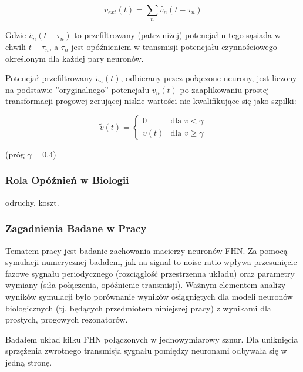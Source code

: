   \begin{equation}
    v_{ext}(t) = \displaystyle\sum\limits_{n} \widetilde{v_{n}}(t-\tau_{n})
  \end{equation}

  Gdzie $\widetilde{v_{n}}(t-\tau_{n})$ to przefiltrowany (patrz niżej) potencjał n-tego sąsiada w chwili $t-\tau_{n}$, a $\tau_{n}$ jest opóźnieniem w transmisji potencjału czynnościowego określonym dla każdej pary neuronów.

  Potencjał przefiltrowany $\widetilde{v_{n}}(t)$, odbierany przez połączone neurony, jest liczony na podstawie ''oryginalnego'' potencjału $v_{n}(t)$ po zaaplikowaniu prostej transformacji progowej zerującej niskie wartości nie kwalifikujące się jako szpilki:

  \begin{equation}
    \tilde{v}(t) = 
    \begin{cases}
      0 & \text{dla } v < \gamma \\
      v(t) & \text{dla } v \geq \gamma 
    \end{cases}
  \end{equation}

  (próg $\gamma = 0.4$)

  \subsubsection{Rola Opóźnień w Biologii}
  odruchy, koszt.
  
  \subsubsection{Zagadnienia Badane w Pracy}

  Tematem pracy jest badanie zachowania macierzy neuronów FHN. Za pomocą symulacji numerycznej badałem, jak na signal-to-noise ratio wpływa przesunięcie fazowe sygnału periodycznego (rozciągłość przestrzenna układu) oraz parametry wymiany (siła połączenia, opóźnienie transmisji). Ważnym elementem analizy wyników symulacji było porównanie wyników osiągniętych dla modeli neuronów biologicznych (tj. będących przedmiotem niniejszej pracy) z wynikami dla prostych, progowych rezonatorów.

  Badałem układ kilku FHN połączonych w jednowymiarowy sznur. Dla uniknięcia sprzężenia zwrotnego  transmisja sygnału pomiędzy neuronami odbywała się w jedną stronę.
